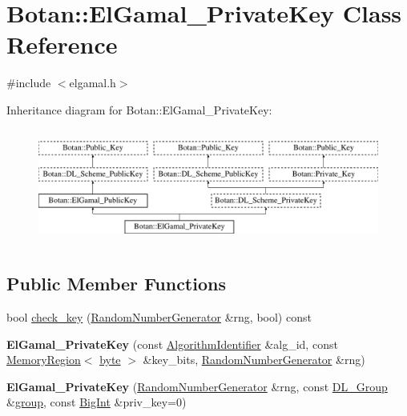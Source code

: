 \hypertarget{classBotan_1_1ElGamal__PrivateKey}{\section{Botan\-:\-:El\-Gamal\-\_\-\-Private\-Key Class Reference}
\label{classBotan_1_1ElGamal__PrivateKey}
}


{\ttfamily \#include $<$elgamal.\-h$>$}

Inheritance diagram for Botan\-:\-:El\-Gamal\-\_\-\-Private\-Key\-:\begin{figure}[H]
\begin{center}
\leavevmode
\includegraphics[height=3.829060cm]{classBotan_1_1ElGamal__PrivateKey}
\end{center}
\end{figure}
\subsection*{Public Member Functions}
\begin{DoxyCompactItemize}
\item 
bool \hyperlink{classBotan_1_1ElGamal__PrivateKey_a7f3b968dd41d6a586185675a57c8a2cc}{check\-\_\-key} (\hyperlink{classBotan_1_1RandomNumberGenerator}{Random\-Number\-Generator} \&rng, bool) const 
\item 
\hypertarget{classBotan_1_1ElGamal__PrivateKey_a916eeecf1ae6b893ea40d9e1578236ac}{{\bfseries El\-Gamal\-\_\-\-Private\-Key} (const \hyperlink{classBotan_1_1AlgorithmIdentifier}{Algorithm\-Identifier} \&alg\-\_\-id, const \hyperlink{classBotan_1_1MemoryRegion}{Memory\-Region}$<$ \hyperlink{namespaceBotan_a7d793989d801281df48c6b19616b8b84}{byte} $>$ \&key\-\_\-bits, \hyperlink{classBotan_1_1RandomNumberGenerator}{Random\-Number\-Generator} \&rng)}\label{classBotan_1_1ElGamal__PrivateKey_a916eeecf1ae6b893ea40d9e1578236ac}

\item 
\hypertarget{classBotan_1_1ElGamal__PrivateKey_afe6ec7c5d39d61eca74d6bf9c65ef875}{{\bfseries El\-Gamal\-\_\-\-Private\-Key} (\hyperlink{classBotan_1_1RandomNumberGenerator}{Random\-Number\-Generator} \&rng, const \hyperlink{classBotan_1_1DL__Group}{D\-L\-\_\-\-Group} \&\hyperlink{classBotan_1_1DL__Scheme__PublicKey_a99e61704126f6c0fcdf5475027a46500}{group}, const \hyperlink{classBotan_1_1BigInt}{Big\-Int} \&priv\-\_\-key=0)}\label{classBotan_1_1ElGamal__PrivateKey_afe6ec7c5d39d61eca74d6bf9c65ef875}

\end{DoxyCompactItemize}
